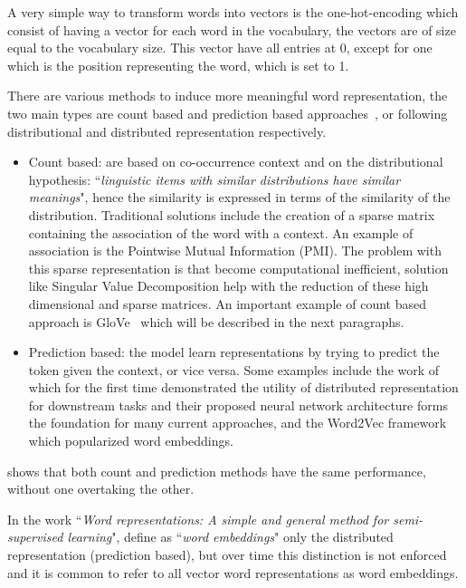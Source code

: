 A very simple way to transform words into vectors is the one-hot-encoding which consist of having a vector for each word in the vocabulary, the vectors are of size equal to the vocabulary size. This vector have all entries at 0, except for one which is the position representing the word, which is set to 1. 

There are various methods to induce more meaningful word representation, the two main types are count based and prediction based approaches~\citep{baroni-etal-2014-dont}, or following~\cite{turian2010word} distributional and distributed representation respectively.


\begin{itemize}[- , itemsep = 0.1em]
\item Count based: are based on co-occurrence context and on the distributional hypothesis:  ``\textit{linguistic items with similar distributions have similar meanings}", hence the similarity is expressed in terms of the similarity of the distribution. Traditional solutions include the creation of a sparse matrix containing the association of the word with a context. An example of association is the Pointwise Mutual Information (PMI). The problem with this sparse representation is that become computational inefficient, solution like Singular Value Decomposition help with the reduction of these high dimensional and sparse matrices. An important example of count based approach is GloVe~\citep{pennington2014glove} which will be described in the next paragraphs.

\item Prediction based: 
the model learn representations by trying to predict the token given the context, or vice versa. Some examples include the work of \citet{collobert2008a} which for the first time demonstrated the utility of distributed representation for downstream tasks and their proposed neural network architecture forms the foundation for many current approaches, and the Word2Vec framework ~\citep{mikolov2013models,mikolov2013distributed} which popularized word embeddings.
\end{itemize}

\cite{levy-etal-2015-improving} shows that both count and prediction methods have the same performance, without one overtaking the other.


In the work ``\textit{Word representations: A simple and general method for semi-supervised learning}", \citet{turian2010word} define as ``\textit{word embeddings}" only the distributed representation (prediction based), but over time this distinction is not enforced and it is common to refer to all vector word representations as word embeddings. 

